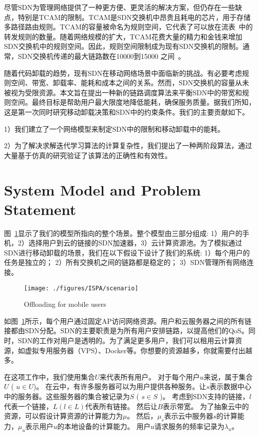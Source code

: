 尽管SDN为管理网络提供了一种更方便、更灵活的解决方案，但仍存在一些缺点，特别是TCAM的限制。TCAM是SDN交换机中昂贵且耗电的芯片，用于存储多路径路由规则。TCAM的容量被命名为规则空间，它代表了可以放在流表~\cite{Dasgupta:2012:DMD:2400771.2401550}中的转发规则的数量。随着网络规模的扩大，TCAM花费大量的精力和金钱来增加SDN交换机中的规则空间。因此，规则空间限制成为现有SDN交换机的限制。通常，SDN交换机传递的最大链路数在10000到15000 之间~\cite{Katta:2014es}。

随着代码卸载的趋势，现有SDN在移动网络场景中面临新的挑战。有必要考虑规则空间、带宽、卸载率、能耗和成本之间的关系。然而，SDN交换机的容量从未被视为受限资源。本文旨在提出一种新的链路调度算法来平衡SDN中的带宽和规则空间。最终目标是帮助用户最大限度地降低能耗，确保服务质量。据我们所知，这是第一次同时研究移动卸载决策和SDN中的约束条件。我们的主要贡献如下。

1）我们建立了一个网络模型来制定SDN中的限制和移动卸载中的能耗。

2）为了解决求解迭代学习算法的计算复杂性，我们提出了一种两阶段算法，通过大量基于仿真的研究验证了该算法的正确性和有效性。

\section{System Model and Problem Statement}

图~\ref{fig_scenario}显示了我们的模型所指向的整个场景。整个模型由三部分组成: 1）用户的手机，2）选择用户到云的链接的SDN加速器，3）云计算资源池。为了模拟通过SDN进行移动卸载的场景，我们在以下假设下设计了我们的系统: 
1）每个用户的任务是独立的；
2）所有交换机之间的链路都是稳定的；
3）SDN管理所有网络连接。

\begin{figure}[!h]
  \vspace{-2em}
  \centering
  \texttt{[image: ./figures/ISPA/scenario]}
  \vspace{-1em}
  \caption{Offloading for mobile users}
  \label{fig_scenario}
\end{figure}

如图~\ref{fig_scenario}所示，每个用户通过固定AP访问网络资源。用户和云服务器之间的所有链接都由SDN分配。SDN的主要职责是为所有用户安排链路，以提高他们的QoS。同时，SDN的工作对用户是透明的。为了满足更多用户，我们可以租用云计算资源，如虚拟专用服务器（VPS）、Docker等。你想要的资源越多，你就需要付出越多。

在这项工作中，我们使用集合$U$来代表所有用户。 对于每个用户$u$来说，属于集合$U$ ( $ u \in U $)。 在云中，有许多服务器可以为用户提供各种服务。让$s$表示数据中心中的服务器。这些服务器的集合被记录为$S$ ( $ s \in S $ )。 考虑到SDN支持的链接，$l$代表一个链接，$ L ( l \in L ) $代表所有链接。 然后让$B$表示带宽。 为了抽象云中的资源，可以假设计算资源的计算能力为$\mu$。 然后，$\mu_s$表示云中服务器$s$的计算能力，$\mu_u$表示用户$u$的本地设备的计算能力。 用户$u$请求服务的频率记录为$ \lambda_u $。

